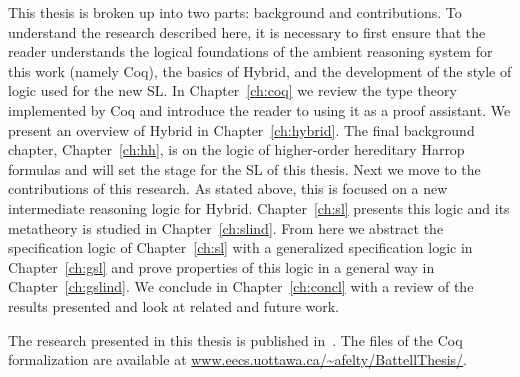 This thesis is broken up into two parts: background and contributions. To understand the research described here, it is necessary to first ensure that the reader understands the logical foundations of the ambient reasoning system for this work (namely Coq), the basics of Hybrid, and the development of the style of logic used for the new SL. In Chapter~\ref{ch:coq} we review the type theory implemented by Coq and introduce the reader to using it as a proof assistant. We present an overview of Hybrid in Chapter~\ref{ch:hybrid}. The final background chapter, Chapter~\ref{ch:hh}, is on the logic of higher-order hereditary Harrop formulas and will set the stage for the SL of this thesis. Next we move to the contributions of this research. As stated above, this is focused on a new intermediate reasoning logic for Hybrid. Chapter~\ref{ch:sl} presents this logic and its metatheory is studied in Chapter~\ref{ch:slind}. From here we abstract the specification logic of Chapter~\ref{ch:sl} with a generalized specification logic in Chapter~\ref{ch:gsl} and prove properties of this logic in a general way in Chapter~\ref{ch:gslind}. We conclude in Chapter~\ref{ch:concl} with a review of the results presented and look at related and future work.

The research presented in this thesis is published in~\cite{BF:LFMTP16}. The files of the Coq formalization are available at \url{www.eecs.uottawa.ca/~afelty/BattellThesis/}.